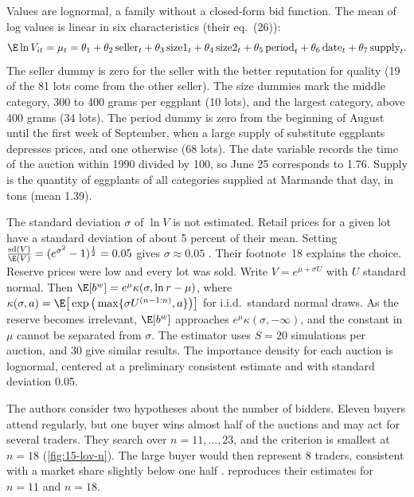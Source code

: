 Values are lognormal, a family without a closed-form bid function. The mean of log values is linear in six
characteristics (their eq.~(26)):
\[
\E\ln V_{it}=\mu_t=\theta_1+\theta_2\,\text{seller}_t+\theta_3\,\text{size1}_t+\theta_4\,\text{size2}_t+\theta_5\,\text{period}_t
+\theta_6\,\text{date}_t+\theta_7\,\text{supply}_t .
\]
The seller dummy is zero for the seller with the better reputation for quality (19 of the 81 lots come from the
other seller). The size dummies mark the middle category, 300 to 400 grams per eggplant (10 lots), and the largest
category, above 400 grams (34 lots). The period dummy is zero from the beginning of August until the first week of
September, when a large supply of substitute eggplants depresses prices, and one otherwise (68 lots). The date
variable records the time of the auction within 1990 divided by 100, so June 25 corresponds to 1.76. Supply is the
quantity of eggplants of all categories supplied at Marmande that day, in tons (mean 1.39).

The standard deviation $\sigma$ of $\ln V$ is not estimated. Retail prices for a given lot have a standard deviation of
about 5 percent of their mean. Setting $\frac{\text{sd}(V)}{\E(V)}=(e^{\sigma^2}-1)^{\frac12}=0.05$ gives $\sigma\approx0.05$
\citep[p.~969]{LaffontOssardVuong1995}. Their footnote~18 explains the choice. Reserve prices were low and every lot
was sold. Write $V=e^{\mu+\sigma U}$ with $U$ standard normal. Then $\E[b^w]=e^{\mu}\kappa(\sigma,\ln r-\mu)$, where
$\kappa(\sigma,a)=\E\big[\exp\big(\max\{\sigma U^{(n-1:n)},a\}\big)\big]$ for i.i.d.\ standard normal draws. As the reserve
becomes irrelevant, $\E[b^w]$ approaches $e^{\mu}\kappa(\sigma,-\infty)$, and the constant in $\mu$ cannot be separated
from $\sigma$. The estimator uses $S=20$ simulations per auction, and 30 give similar results. The importance density
for each auction is lognormal, centered at a preliminary consistent estimate and with standard deviation 0.05.

The authors consider two hypotheses about the number of bidders. Eleven buyers attend regularly, but one buyer wins
almost half of the auctions and may act for several traders. They search over $n=11,\dots,23$, and the criterion is
smallest at $n=18$ (\cref{fig:15-lov-n}). The large buyer would then represent 8 traders, consistent with a market
share slightly below one half \citep[p.~970]{LaffontOssardVuong1995}.  reproduces their estimates for
$n=11$ and $n=18$.

